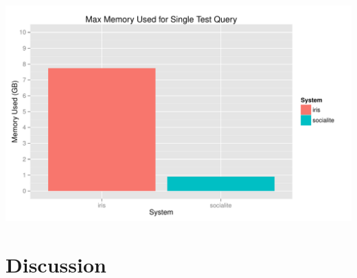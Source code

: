 \documentclass{article}
\begin{document}
\begin{multicols}{2}
\begingroup
    \centering
    \includegraphics[scale=0.4]{../results/memory.pdf}
    \label{fig:memory}
\endgroup
\section{Discussion}





\end{multicols}
\end{document}
